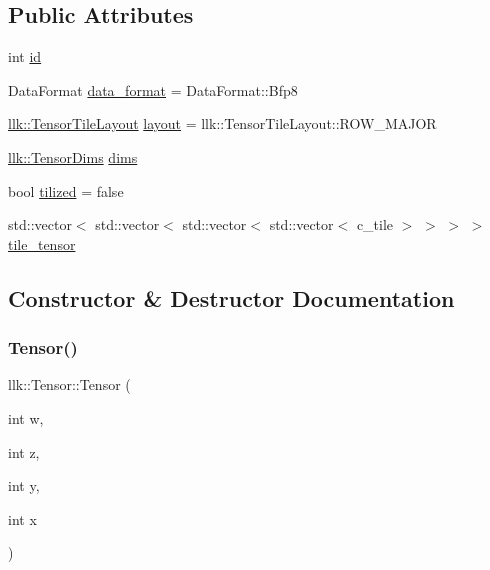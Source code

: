\subsection*{Public Attributes}
\begin{DoxyCompactItemize}
\item 
int \hyperlink{classllk_1_1Tensor_ae2065c91de3ad15ae38c0df9d8762f1d}{id}
\item 
Data\+Format \hyperlink{classllk_1_1Tensor_a7a956f878f61e36905df16a6c3b043aa}{data\+\_\+format} = Data\+Format\+::\+Bfp8
\item 
\hyperlink{namespacellk_a1cb439631a4f96e1431eea4d9b1f5cdb}{llk\+::\+Tensor\+Tile\+Layout} \hyperlink{classllk_1_1Tensor_ab1d8bf151b3f9e7f6c3593937a795681}{layout} = llk\+::\+Tensor\+Tile\+Layout\+::\+R\+O\+W\+\_\+\+M\+A\+J\+OR
\item 
\hyperlink{structllk_1_1TensorDims}{llk\+::\+Tensor\+Dims} \hyperlink{classllk_1_1Tensor_a6bad1b600bb823472f1aa770d3bbc173}{dims}
\item 
bool \hyperlink{classllk_1_1Tensor_ae083a87e42384c49611eeda3c551e620}{tilized} = false
\item 
std\+::vector$<$ std\+::vector$<$ std\+::vector$<$ std\+::vector$<$ c\+\_\+tile $>$ $>$ $>$ $>$ \hyperlink{classllk_1_1Tensor_ab4e13f105e99e94bf3c10be7d0447614}{tile\+\_\+tensor}
\end{DoxyCompactItemize}


\subsection{Constructor \& Destructor Documentation}
\mbox{\label{classllk_1_1Tensor_a81f468a4cb7d319155de32409bef5432}} 
\subsubsection{\texorpdfstring{Tensor()}{Tensor()}\hspace{0.1cm}{\footnotesize\ttfamily [1/8]}}
{\footnotesize\ttfamily llk\+::\+Tensor\+::\+Tensor (\begin{DoxyParamCaption}\item[{int}]{w,  }\item[{int}]{z,  }\item[{int}]{y,  }\item[{int}]{x }\end{DoxyParamCaption})}



